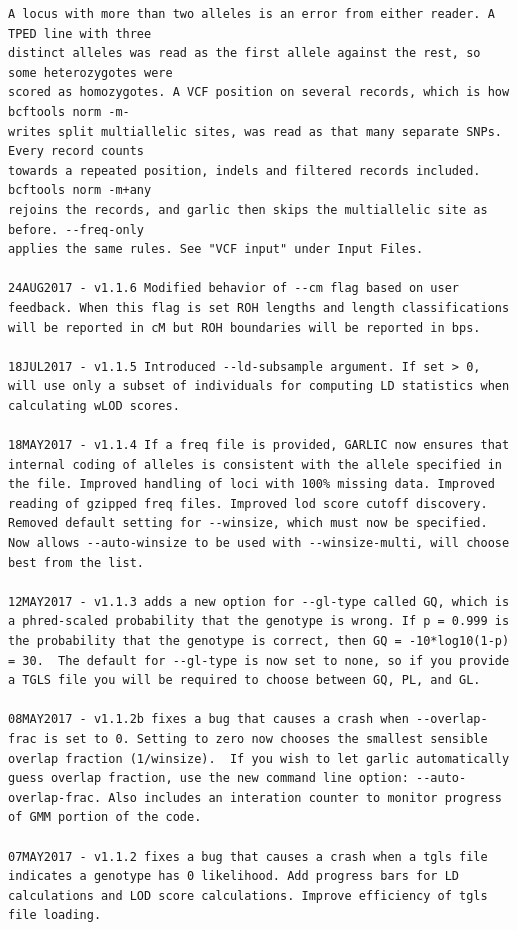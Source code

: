\documentclass[12pt]{article}%
\begin{document}
\begin{lstlisting}
A locus with more than two alleles is an error from either reader. A TPED line with three
distinct alleles was read as the first allele against the rest, so some heterozygotes were
scored as homozygotes. A VCF position on several records, which is how bcftools norm -m-
writes split multiallelic sites, was read as that many separate SNPs. Every record counts
towards a repeated position, indels and filtered records included. bcftools norm -m+any
rejoins the records, and garlic then skips the multiallelic site as before. --freq-only
applies the same rules. See "VCF input" under Input Files.

24AUG2017 - v1.1.6 Modified behavior of --cm flag based on user feedback. When this flag is set ROH lengths and length classifications will be reported in cM but ROH boundaries will be reported in bps.

18JUL2017 - v1.1.5 Introduced --ld-subsample argument. If set > 0, will use only a subset of individuals for computing LD statistics when calculating wLOD scores. 

18MAY2017 - v1.1.4 If a freq file is provided, GARLIC now ensures that internal coding of alleles is consistent with the allele specified in the file. Improved handling of loci with 100% missing data. Improved reading of gzipped freq files. Improved lod score cutoff discovery. Removed default setting for --winsize, which must now be specified. Now allows --auto-winsize to be used with --winsize-multi, will choose best from the list.

12MAY2017 - v1.1.3 adds a new option for --gl-type called GQ, which is a phred-scaled probability that the genotype is wrong. If p = 0.999 is the probability that the genotype is correct, then GQ = -10*log10(1-p) = 30.  The default for --gl-type is now set to none, so if you provide a TGLS file you will be required to choose between GQ, PL, and GL.

08MAY2017 - v1.1.2b fixes a bug that causes a crash when --overlap-frac is set to 0. Setting to zero now chooses the smallest sensible overlap fraction (1/winsize).  If you wish to let garlic automatically guess overlap fraction, use the new command line option: --auto-overlap-frac. Also includes an interation counter to monitor progress of GMM portion of the code.

07MAY2017 - v1.1.2 fixes a bug that causes a crash when a tgls file indicates a genotype has 0 likelihood. Add progress bars for LD calculations and LOD score calculations. Improve efficiency of tgls file loading.


\end{lstlisting}
\end{document}
